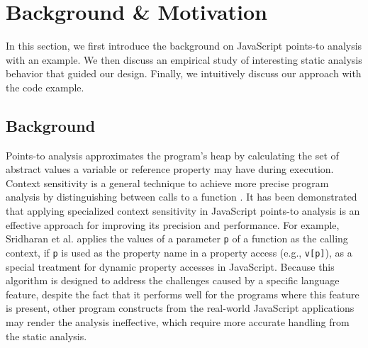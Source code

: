 \section{Background \& Motivation}
\label{background}

In this section, we first introduce the background on JavaScript points-to analysis with an example. We then discuss an empirical study of interesting static analysis behavior that guided our design. Finally, we intuitively discuss our approach with the code example.

\subsection{Background}


Points-to analysis approximates the program's heap by calculating the set of abstract values a variable or reference property may have during execution. Context sensitivity is a general technique to achieve more precise program analysis by distinguishing between calls to a function \cite{sharir1981two}. It has been demonstrated that applying specialized context sensitivity in JavaScript points-to analysis is an effective approach for improving its precision and performance. For example, Sridharan et al. \cite{Sridharan:2012:CTP:2367163.2367191} applies the values of a parameter {\tt p} of a function as the calling context, if {\tt p} is used as the property name in a property access (e.g., {\tt v[p]}), as a special treatment for dynamic property accesses in JavaScript. Because this algorithm is designed to address the challenges caused by a specific language feature, despite the fact that it performs well for the programs where this feature is present, other program constructs from the real-world JavaScript applications may render the analysis ineffective, which require more accurate handling from the static analysis.

